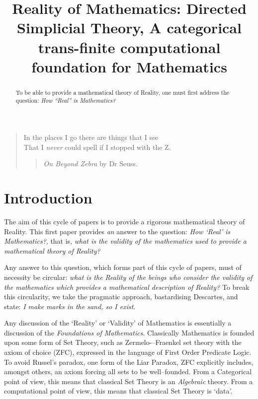 \documentclass[a4paper,openany]{amsbook}
\begin{document}
\frontmatter
\sloppy

\title[DiSimplicial Theory]{Reality of Mathematics: Directed Simplicial Theory, A 
categorical trans-finite computational foundation for Mathematics}

%

\begin{abstract}
To be able to provide a mathematical theory of Reality, one must first 
address the question: \textit{How ``Real'' is Mathematics?}
\end{abstract} 
\maketitle 
\tableofcontents 
\mainmatter

\begin{quotation}
In the places I go there are things that I see\\
That I \emph{never} could spell if I stopped with the Z.\\
\begin{quote}
\textit{On Beyond Zebra} by Dr Seuss.
\end{quote}
\end{quotation}

\section{Introduction}

The aim of this cycle of papers is to provide a rigorous mathematical theory of
Reality. This first paper provides \emph{an} answer to the question: \emph{How
`Real' is Mathematics?}, that is, \emph{what is the validity of the
mathematics used to provide a mathematical theory of Reality?}

Any answer to this question, which forms part of this cycle of papers, must of
necessity be circular: \emph{what is the Reality of the beings who consider the
validity of the mathematics which provides a mathematical description of
Reality?} To break this circularity, we take the pragmatic approach,
bastardising Descartes, and state: \emph{I make marks in the sand, so I exist}.

Any discussion of the `Reality' or `Validity' of Mathematics is essentially a
discussion of the \textit{Foundations of Mathematics}. Classically Mathematics
is founded upon some form of Set Theory, such as Zermelo-–Fraenkel set theory
with the axiom of choice (ZFC), expressed in the language of First Order
Predicate Logic. To avoid Russel's paradox, one form of the Liar Paradox, ZFC
explicitly includes, amongst others, an axiom forcing all sets to be
well--founded. From a Categorical point of view, this means that classical Set
Theory is an \emph{Algebraic} theory. From a computational point of view, this
means that classical Set Theory is `data'.
\end{document}
